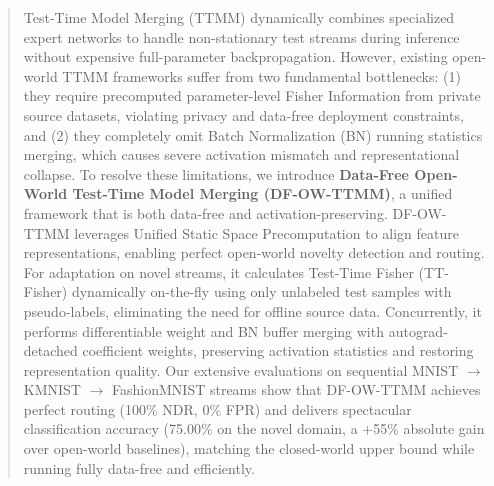 \documentclass{article}
\theoremstyle{plain}
\theoremstyle{definition}
\theoremstyle{remark}
\begin{document}

\printAffiliationsAndNotice{}

\begin{abstract}
Test-Time Model Merging (TTMM) dynamically combines specialized expert networks to handle non-stationary test streams during inference without expensive full-parameter backpropagation. However, existing open-world TTMM frameworks suffer from two fundamental bottlenecks: (1) they require precomputed parameter-level Fisher Information from private source datasets, violating privacy and data-free deployment constraints, and (2) they completely omit Batch Normalization (BN) running statistics merging, which causes severe activation mismatch and representational collapse. To resolve these limitations, we introduce \textbf{Data-Free Open-World Test-Time Model Merging (DF-OW-TTMM)}, a unified framework that is both data-free and activation-preserving. DF-OW-TTMM leverages Unified Static Space Precomputation to align feature representations, enabling perfect open-world novelty detection and routing. For adaptation on novel streams, it calculates Test-Time Fisher (TT-Fisher) dynamically on-the-fly using only unlabeled test samples with pseudo-labels, eliminating the need for offline source data. Concurrently, it performs differentiable weight and BN buffer merging with autograd-detached coefficient weights, preserving activation statistics and restoring representation quality. Our extensive evaluations on sequential MNIST $\rightarrow$ KMNIST $\rightarrow$ FashionMNIST streams show that DF-OW-TTMM achieves perfect routing (100\% NDR, 0\% FPR) and delivers spectacular classification accuracy (75.00\% on the novel domain, a +55\% absolute gain over open-world baselines), matching the closed-world upper bound while running fully data-free and efficiently.
\end{abstract}
\end{document}
